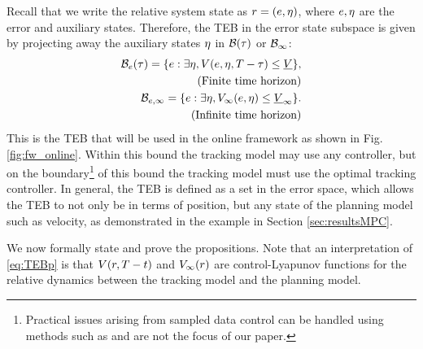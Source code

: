 Recall that we write the relative system state as $r = (e, \eta)$, where $e,\eta$ are the error and auxiliary states.
Therefore, the TEB in the error state subspace is given by projecting away the auxiliary states $\eta$ in $\mathcal B(\tau)$ or $\mathcal B_\infty$:
\begin{subequations} \label{eq:TEBp}
  \begin{align} 
  \TEB_\estate(\tau) = \{\estate: \exists \astate, \valfunc(\estate, \astate, \thor-\tau) \le \underline\valfunc\},\label{eq:TEBp:inf} \\
  \quad \text{(Finite time horizon)} \nonumber\\
  \TEB_{\estate, \infty} = \{\estate: \exists \astate, \valfunc_\infty(\estate, \astate) \le \underline\valfunc_\infty\}. \label{eq:TEBp:fin} \\
  \quad \text{(Infinite time horizon)} \nonumber
  \end{align}
\end{subequations}
This is the TEB that will be used in the online framework as shown in Fig. \ref{fig:fw_online}. 
Within this bound the tracking model may use any controller, but on the boundary\footnote{Practical issues arising from sampled data control can be handled using methods such as \cite{Mitchell2012, Mitchell13, Dabadie2014} and are not the focus of our paper.} of this bound the tracking model must use the optimal tracking controller.
In general, the TEB is defined as a set in the error space, which allows the TEB to not only be in terms of position, but any state of the planning model such as velocity, as demonstrated in the example in Section \ref{sec:resultsMPC}.

We now formally state and prove the propositions. 
Note that an interpretation of \eqref{eq:TEBp} is that $V(r, T - t)$ and $V_\infty(r)$ are control-Lyapunov functions for the relative dynamics between the tracking model and the planning model.

